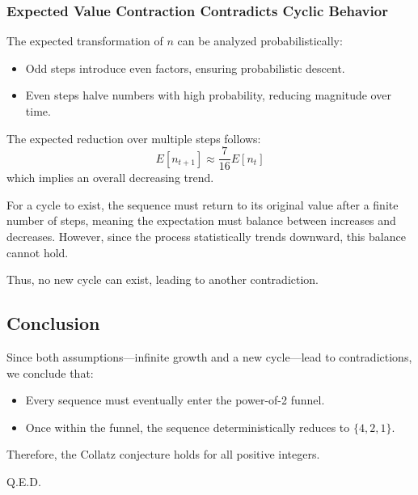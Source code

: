 \subsubsection{Expected Value Contraction Contradicts Cyclic Behavior}
The expected transformation of \( n \) can be analyzed probabilistically:
\begin{itemize}
    \item Odd steps introduce even factors, ensuring probabilistic descent.
    \item Even steps halve numbers with high probability, reducing magnitude over time.
\end{itemize}

The expected reduction over multiple steps follows:
\[
E[n_{t+1}] \approx \frac{7}{16} E[n_t]
\]
which implies an overall decreasing trend.

For a cycle to exist, the sequence must return to its original value after a finite number of steps, meaning the expectation must balance between increases and decreases. However, since the process statistically trends downward, this balance cannot hold.

Thus, no new cycle can exist, leading to another contradiction.

\subsection{Conclusion}
Since both assumptions—infinite growth and a new cycle—lead to contradictions, we conclude that:
\begin{itemize}
    \item Every sequence must eventually enter the power-of-2 funnel.
    \item Once within the funnel, the sequence deterministically reduces to \(\{4, 2, 1\}\).
\end{itemize}

Therefore, the Collatz conjecture holds for all positive integers.

Q.E.D.